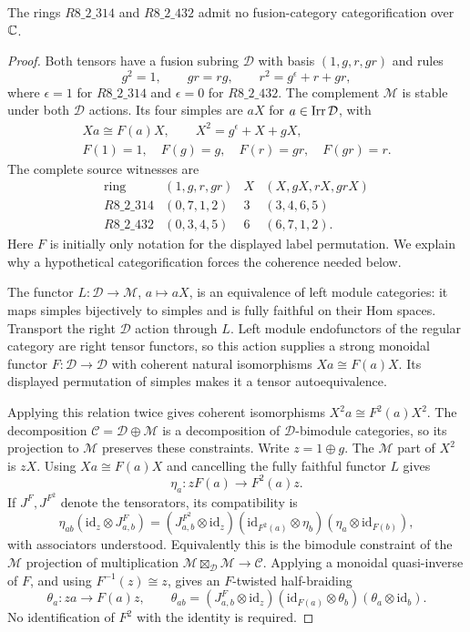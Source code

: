 \begin{proposition}\label{prop:twisted-two}
The rings $R8\_2\_314$ and $R8\_2\_432$ admit no
fusion-category categorification over $\mathbb C$.
\end{proposition}
\begin{proof}
Both tensors have a fusion subring $\mathcal D$ with basis
$(1,g,r,gr)$ and rules
\[
g^2=1,\qquad gr=rg,\qquad r^2=g^\epsilon+r+gr,
\]
where $\epsilon=1$ for $R8\_2\_314$ and $\epsilon=0$ for
$R8\_2\_432$. The complement $\mathcal M$ is stable under
both $\mathcal D$ actions. Its four simples are $aX$ for
$a\in\operatorname{Irr}\mathcal D$, with
\[
\begin{gathered}
Xa\cong F(a)X,\qquad X^2=g^\epsilon+X+gX,\\
F(1)=1,\quad F(g)=g,\quad F(r)=gr,\quad F(gr)=r.
\end{gathered}
\]
The complete source witnesses are
\[
\begin{array}{c|c|c|c}
\text{ring}&(1,g,r,gr)&X&(X,gX,rX,grX)\\\hline
R8\_2\_314&(0,7,1,2)&3&(3,4,6,5)\\
R8\_2\_432&(0,3,4,5)&6&(6,7,1,2).
\end{array}
\]
Here $F$ is initially only notation for the displayed label
permutation. We explain why a hypothetical categorification
forces the coherence needed below.

The functor $L:\mathcal D\to\mathcal M$, $a\mapsto aX$, is
an equivalence of left module categories: it maps simples
bijectively to simples and is fully faithful on their Hom
spaces. Transport the right $\mathcal D$ action through $L$.
Left module endofunctors of the regular category are right
tensor functors, so this action supplies a strong monoidal
functor $F:\mathcal D\to\mathcal D$ with coherent natural
isomorphisms $Xa\cong F(a)X$. Its displayed permutation of
simples makes it a tensor autoequivalence.

Applying this relation twice gives coherent isomorphisms
$X^2a\cong F^2(a)X^2$. The decomposition
$\mathcal C=\mathcal D\oplus\mathcal M$ is a decomposition
of $\mathcal D$-bimodule categories, so its projection to
$\mathcal M$ preserves these constraints. Write $z=1\oplus g$.
The $\mathcal M$ part of $X^2$ is $zX$. Using $Xa\cong F(a)X$
and cancelling the fully faithful functor $L$ gives
\[
\eta_a:zF(a)\longrightarrow F^2(a)z.
\]
If $J^F,J^{F^2}$ denote the tensorators, its compatibility is
\[
\eta_{ab}(\mathrm{id}_z\otimes J^F_{a,b})
 =(J^{F^2}_{a,b}\otimes\mathrm{id}_z)
  (\mathrm{id}_{F^2(a)}\otimes\eta_b)
  (\eta_a\otimes\mathrm{id}_{F(b)}),
\]
with associators understood. Equivalently this is the bimodule
constraint of the $\mathcal M$ projection of multiplication
$\mathcal M\boxtimes_{\mathcal D}\mathcal M\to\mathcal C$.
Applying a monoidal quasi-inverse of $F$, and using
$F^{-1}(z)\cong z$, gives an $F$-twisted half-braiding
\begin{equation}\label{eq:twisted-half-braiding}
\theta_a:za\longrightarrow F(a)z,\qquad
\theta_{ab}=(J^F_{a,b}\otimes\mathrm{id}_z)
 (\mathrm{id}_{F(a)}\otimes\theta_b)
 (\theta_a\otimes\mathrm{id}_b).
\end{equation}
No identification of $F^2$ with the identity is required.


\end{proof}

